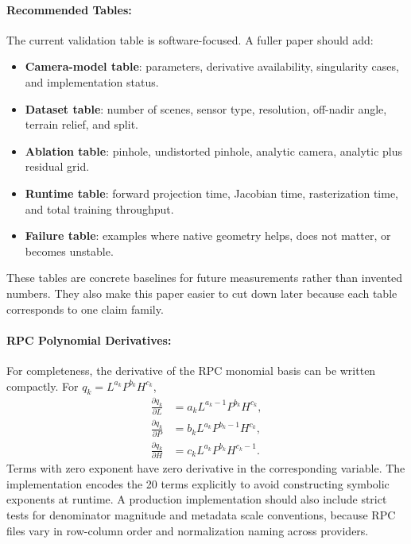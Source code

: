 \documentclass{article}
\begin{document}
\paragraph{Recommended Tables:}

The current validation table is software-focused. A fuller paper should add:
\begin{itemize}
  \item \textbf{Camera-model table}: parameters, derivative availability, singularity cases, and implementation status.
  \item \textbf{Dataset table}: number of scenes, sensor type, resolution, off-nadir angle, terrain relief, and split.
  \item \textbf{Ablation table}: pinhole, undistorted pinhole, analytic camera, analytic plus residual grid.
  \item \textbf{Runtime table}: forward projection time, Jacobian time, rasterization time, and total training throughput.
  \item \textbf{Failure table}: examples where native geometry helps, does not matter, or becomes unstable.
\end{itemize}
These tables are concrete baselines for future measurements rather than invented numbers. They also make this paper easier to cut down later because each table corresponds to one claim family.

\paragraph{RPC Polynomial Derivatives:}

For completeness, the derivative of the RPC monomial basis can be written compactly. For $q_k=L^{a_k}P^{b_k}H^{c_k}$,
\begin{equation}
\begin{aligned}
\frac{\partial q_k}{\partial L}&=a_k L^{a_k-1}P^{b_k}H^{c_k},\\
\frac{\partial q_k}{\partial P}&=b_k L^{a_k}P^{b_k-1}H^{c_k},\\
\frac{\partial q_k}{\partial H}&=c_k L^{a_k}P^{b_k}H^{c_k-1}.
\end{aligned}
\end{equation}
Terms with zero exponent have zero derivative in the corresponding variable. The implementation encodes the 20 terms explicitly to avoid constructing symbolic exponents at runtime. A production implementation should also include strict tests for denominator magnitude and metadata scale conventions, because RPC files vary in row-column order and normalization naming across providers.
\end{document}
